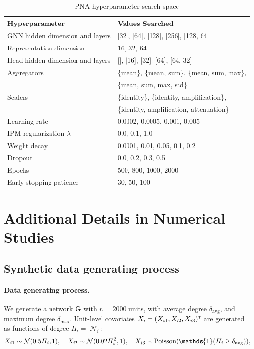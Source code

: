 \documentclass[twoside,letterpaper]{article}
\newcommand{\mathbbm}[1]{\mathds{#1}}
\theoremstyle{plain}
\theoremstyle{definition}
\theoremstyle{remark}
\def\T{{\textsc{t}}}
\newcommand{\bG}{\boldsymbol{G}}
\newcommand{\cN}{\mathcal{N}}
\newcommand{\indicator}{\mathbbm{1}}
\begin{document}
\begin{table}[h]
    \centering
    \caption{PNA hyperparameter search space}
    \label{tab:pna_tuning}
    \begin{tabular}{ll}
        \toprule
        Hyperparameter & Values Searched \\
        \midrule
        GNN hidden dimension and layers & [32], [64], [128], [256], [128, 64] \\
        Representation dimension & 16, 32, 64 \\
        Head hidden dimension and layers & [], [16], [32], [64], [64, 32]\\
        Aggregators & \{mean\}, \{mean, sum\}, \{mean, sum, max\}, \\
                    & \{mean, sum, max, std\} \\
        Scalers & \{identity\}, \{identity, amplification\}, \\
                & \{identity, amplification, attenuation\} \\
        Learning rate & 0.0002, 0.0005, 0.001, 0.005 \\
        IPM regularization $\lambda$ & 0.0, 0.1, 1.0 \\
        Weight decay & 0.0001, 0.01, 0.05, 0.1, 0.2 \\
        Dropout & 0.0, 0.2, 0.3, 0.5 \\
        Epochs & 500, 800, 1000, 2000 \\
        Early stopping patience & 30, 50, 100 \\
        \bottomrule
    \end{tabular}
\end{table}


\section{Additional Details in Numerical Studies}

\subsection{Synthetic data generating process}
\label{sec:dgp_simulation}
\paragraph{Data generating process.} We generate a network $\bG$ with $n=2000$ units, with average degree $\delta_{\text{avg}}$, and maximum degree $\delta_{\text{max}}$.  Unit-level covariates $X_i = (X_{i1}, X_{i2}, X_{i3})^\T$ are generated as functions of degree $H_i = |\cN_i|$:
\begin{align*}
    X_{i1} \sim \cN(0.5 H_i, 1), \quad X_{i2} \sim \cN(0.02 H_i^2, 1), \quad X_{i3} \sim \textup{Poisson}(\indicator(H_i \geq \delta_{\text{avg}})),
\end{align*}
\end{document}
